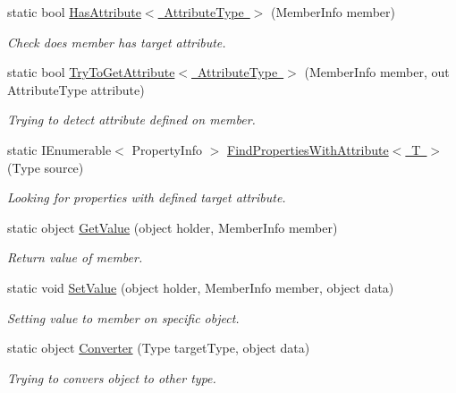 \begin{DoxyCompactItemize}
static bool \mbox{\hyperlink{class_uniform_data_operator_1_1_assemblies_management_1_1_members_handler_a4b9cd91b2f9c5f8871e71ff70912ff8d}{Has\+Attribute$<$ Attribute\+Type $>$}} (Member\+Info member)
\begin{DoxyCompactList}\small\item\em Check does member has target attribute. \end{DoxyCompactList}\item 
static bool \mbox{\hyperlink{class_uniform_data_operator_1_1_assemblies_management_1_1_members_handler_ab99b085c361e2edc003149ea57203f93}{Try\+To\+Get\+Attribute$<$ Attribute\+Type $>$}} (Member\+Info member, out Attribute\+Type attribute)
\begin{DoxyCompactList}\small\item\em Trying to detect attribute defined on member. \end{DoxyCompactList}\item 
static I\+Enumerable$<$ Property\+Info $>$ \mbox{\hyperlink{class_uniform_data_operator_1_1_assemblies_management_1_1_members_handler_af18869106319a1b9b0473a817a3c1964}{Find\+Properties\+With\+Attribute$<$ T $>$}} (Type source)
\begin{DoxyCompactList}\small\item\em Looking for properties with defined target attribute. \end{DoxyCompactList}\item 
static object \mbox{\hyperlink{class_uniform_data_operator_1_1_assemblies_management_1_1_members_handler_a6cc89d5d7bbec4fe48b7f698ead2667f}{Get\+Value}} (object holder, Member\+Info member)
\begin{DoxyCompactList}\small\item\em Return value of member. \end{DoxyCompactList}\item 
static void \mbox{\hyperlink{class_uniform_data_operator_1_1_assemblies_management_1_1_members_handler_a78639bd006a0e62b40abc26043f63c5b}{Set\+Value}} (object holder, Member\+Info member, object data)
\begin{DoxyCompactList}\small\item\em Setting value to member on specific object. \end{DoxyCompactList}\item 
static object \mbox{\hyperlink{class_uniform_data_operator_1_1_assemblies_management_1_1_members_handler_a0401f2325dda95a28dea4129e62bc9fd}{Converter}} (Type target\+Type, object data)
\begin{DoxyCompactList}\small\item\em Trying to convers object to other type. \end{DoxyCompactList}\item 

\end{DoxyCompactItemize}
